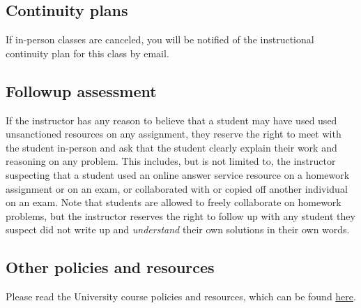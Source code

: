 \documentclass[12pt]{amsart}
\begin{document}
\subsection*{Continuity plans} 
If in-person classes are canceled, you will be notified of the instructional continuity plan for this class by email.

\subsection*{Followup assessment} If the instructor has any reason to believe that a student may have used used unsanctioned resources on any assignment, they reserve the right to meet with the student in-person and ask that the student clearly explain their work and reasoning on any problem. This includes, but is not limited to, the instructor suspecting that a student used an online answer service resource on a homework assignment or on an exam, or collaborated with or copied off another individual on an exam. Note that students are allowed to freely collaborate on homework problems, but the instructor reserves the right to follow up with any student they suspect did not write up and \emph{understand} their own solutions in their own words.

\subsection*{Other policies and resources}

Please read the University course policies and resources, which can be found \href{https://executivevc.unl.edu/academic-excellence/teaching-resources/course-policies}{here}.
\end{document}

